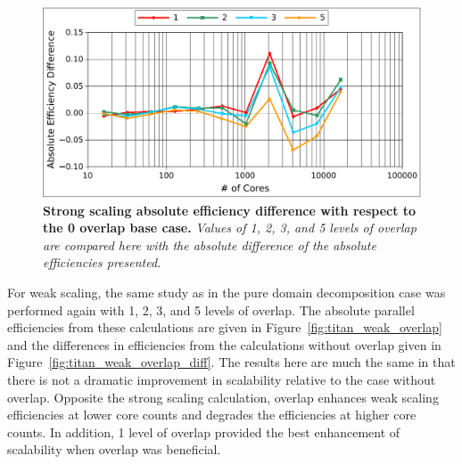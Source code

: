 \begin{figure}[t!]
  \begin{center}
    \includegraphics[width=6in]{chapters/parallel_mc/titan_strong_overlap_diff.pdf}
  \end{center}
  \caption{\textbf{Strong scaling absolute efficiency difference with
      respect to the 0 overlap base case.} \textit{Values of 1, 2, 3,
      and 5 levels of overlap are compared here with the absolute
      difference of the absolute efficiencies presented.}}
  \label{fig:titan_strong_overlap_diff}
\end{figure}

For weak scaling, the same study as in the pure domain decomposition
case was performed again with 1, 2, 3, and 5 levels of overlap. The
absolute parallel efficiencies from these calculations are given in
Figure~\ref{fig:titan_weak_overlap} and the differences in
efficiencies from the calculations without overlap given in
Figure~\ref{fig:titan_weak_overlap_diff}. The results here are much
the same in that there is not a dramatic improvement in scalability
relative to the case without overlap. Opposite the strong scaling
calculation, overlap enhances weak scaling efficiencies at lower core
counts and degrades the efficiencies at higher core counts. In
addition, 1 level of overlap provided the best enhancement of
scalability when overlap was beneficial.

